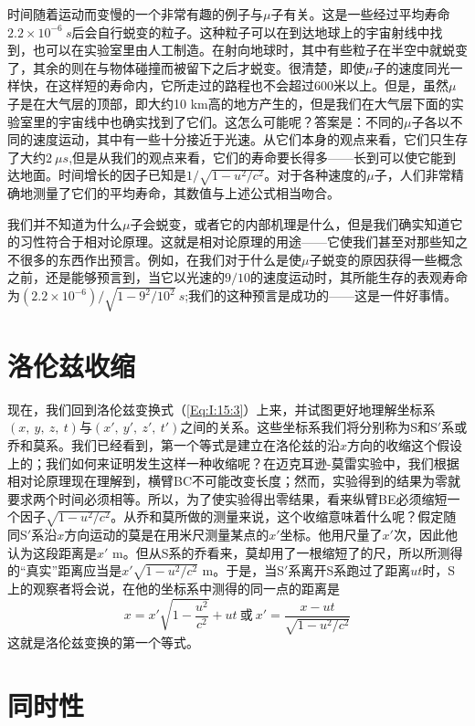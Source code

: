 时间随着运动而变慢的一个非常有趣的例子与$\mu$子有关。这是一些经过平均寿命$2.2 \times 10^{-6}~s$后会自行蜕变的粒子。这种粒子可以在到达地球上的宇宙射线中找到，也可以在实验室里由人工制造。在射向地球时，其中有些粒子在半空中就蜕变了，其余的则在与物体碰撞而被留下之后才蜕变。很清楚，即使$\mu$子的速度同光一样快，在这样短的寿命内，它所走过的路程也不会超过600米以上。但是，虽然$\mu$子是在大气层的顶部，即大约10 km高的地方产生的，但是我们在大气层下面的实验室里的宇宙线中也确实找到了它们。这怎么可能呢？答案是：不同的$\mu$子各以不同的速度运动，其中有一些十分接近于光速。从它们本身的观点来看，它们只生存了大约$2~\mu s$,但是从我们的观点来看，它们的寿命要长得多——长到可以使它能到达地面。时间增长的因子已知是$1/\sqrt{1-u^2/c^2}$。对于各种速度的$\mu$子，人们非常精确地测量了它们的平均寿命，其数值与上述公式相当吻合。

我们并不知道为什么$\mu$子会蜕变，或者它的内部机理是什么，但是我们确实知道它的习性符合于相对论原理。这就是相对论原理的用途——它使我们甚至对那些知之不很多的东西作出预言。例如，在我们对于什么是使$\mu$子蜕变的原因获得一些概念之前，还是能够预言到，当它以光速的$9/10$的速度运动时，其所能生存的表观寿命为$(2.2 \times 10^{-6})/\sqrt{1-9^2/10^2}~s$;我们的这种预言是成功的——这是一件好事情。

\section{洛伦兹收缩}

现在，我们回到洛伦兹变换式（\ref{Eq:I:15:3}）上来，并试图更好地理解坐标系$(x,~y,~z,~t)$与$(x',~y',~z',~t')$之间的关系。这些坐标系我们将分别称为S和S$'$系或乔和莫系。我们已经看到，第一个等式是建立在洛伦兹的沿$x$方向的收缩这个假设上的；我们如何来证明发生这样一种收缩呢？在迈克耳逊-莫雷实验中，我们根据相对论原理现在理解到，横臂BC不可能改变长度；然而，实验得到的结果为零就要求两个时间必须相等。所以，为了使实验得出零结果，看来纵臂BE必须缩短一个因子$\sqrt{1-u^2/c^2}$。从乔和莫所做的测量来说，这个收缩意味着什么呢？假定随同S$'$系沿$x$方向运动的莫是在用米尺测量某点的$x'$坐标。他用尺量了$x'$次，因此他认为这段距离是$x'$ m。但从S系的乔看来，莫却用了一根缩短了的尺，所以所测得的“真实”距离应当是$x'\sqrt{1-u^2/c^2}$ m。于是，当S$'$系离开S系跑过了距离$ut$时，S上的观察者将会说，在他的坐标系中测得的同一点的距离是
\begin{equation*}
    x=x'\sqrt{1-\frac{u^2}{c^2}}+ut~\text{或}~x'=\frac{x-ut}{\sqrt{1-u^2/c^2}}
\end{equation*}
这就是洛伦兹变换的第一个等式。

\section{同时性}

